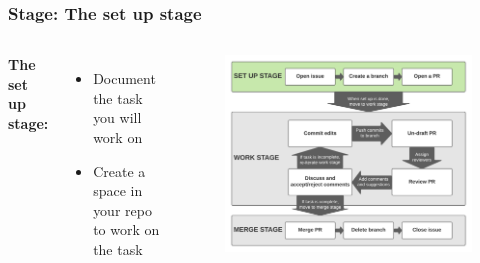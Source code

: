 \documentclass[aspectratio=169]{beamer} %
\begin{document}
\begin{frame}
	\frametitle{Stage: The set up stage}
	\begin{columns}[c]

		
		\Large \textbf{The set up stage:}
		\vspace{1em}
		\normalsize
		
		\begin{itemize}
			\setlength\itemsep{1em}
			\item Document the task you will work on
			\item Create a space in your repo to work on the task
		\end{itemize}
		
		\vspace{-.75cm}
		\begin{figure}
			\centering
			\includegraphics[width=\textwidth]{./img/branch-pr-merge-cycle-S1.png}
		\end{figure}
		
	\end{columns}
\end{frame}
\end{document}
